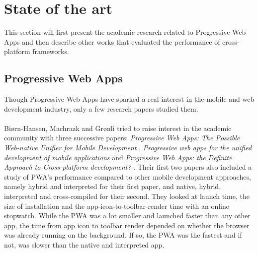 \documentclass{kththesis}
\begin{document}
\section{State of the art} 


This section will first present the academic research related to Progressive Web Apps and then describe other works that evaluated the performance of cross-platform frameworks.

\subsection{Progressive Web Apps}
Though Progressive Web Apps have sparked a real interest in the mobile and web development industry, only a few research papers studied them\cite{PWApossibleUnifer, Biorn-Hansen2, Biorn-Hansen3}.

\paragraph{}
Biørn-Hansen, Machrazk and Grønli tried to raise interest in the academic community with three successive papers: \textit{Progressive Web Apps: The Possible Web-native Unifier for Mobile Development} \cite{PWApossibleUnifer}, \textit{Progressive web apps for the unified development of mobile applications} \cite{Biorn-Hansen2} and \textit{Progressive Web Apps: the Definite Approach to Cross-platform development?} \cite{Biorn-Hansen3}. Their first two papers also included a study of PWA's performance compared to other mobile development approaches, namely hybrid and interpreted for their first paper, and native, hybrid, interpreted and cross-compiled for their second. They looked at launch time, the size of installation and the app-icon-to-toolbar-render time with an online stopwatch. While the PWA was a lot smaller and launched faster than any other app, the time from app icon to toolbar render depended on whether the browser was already running on the background. If so, the PWA was the fastest and if not, was slower than the native and interpreted app. 
\end{document}
